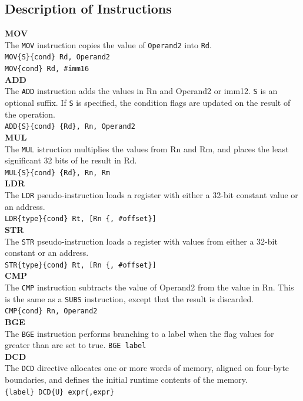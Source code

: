 \documentclass[footheight=20pt, footsepline, headheight=20pt, headsepline]{scrartcl}
\begin{document}
\subsection*{Description of Instructions}
\textbf{MOV}\\The \verb|MOV| instruction copies the value of \verb|Operand2| into \verb|Rd|.\\
\verb|MOV{S}{cond} Rd, Operand2|\\
\verb|MOV{cond} Rd, #imm16|\\
\textbf{ADD}\\
The \verb|ADD| instruction adds the values in Rn and Operand2 or imm12. \verb|S| is an optional suffix. If \verb|S| is specified, the condition flags are updated on the result of the operation.\\
\verb|ADD{S}{cond} {Rd}, Rn, Operand2|\\
\textbf{MUL}\\
The \verb|MUL| istruction multiplies the values from Rn and Rm, and places the least significant 32 bits of he result in Rd.\\
\verb |MUL{S}{cond} {Rd}, Rn, Rm|\\
\textbf{LDR}\\
The \verb|LDR| pseudo-instruction loads a register with either a 32-bit constant value or an address.\\
\verb|LDR{type}{cond} Rt, [Rn {, #offset}]| \\
\textbf{STR}\\
The \verb|STR| pseudo-instruction loads a register with values from either a 32-bit constant or an address.\\
\verb|STR{type}{cond} Rt, [Rn {, #offset}]|\\  
\textbf{CMP}\\
The \verb|CMP| instruction subtracts the value of Operand2 from the value in Rn. This is the same as a \verb|SUBS| instruction, except that the result is discarded.\\
\verb|CMP{cond} Rn, Operand2|\\
\textbf{BGE}\\
The \verb|BGE| instruction performs branching to a label when the flag values for greater than are set to true.
\verb|BGE label|\\
\textbf{DCD}\\
The \verb|DCD| directive allocates one or more words of memory, aligned on four-byte boundaries, and defines the initial runtime contents of the memory.\\
\verb|{label} DCD{U} expr{,expr}|\\
\end{document}

